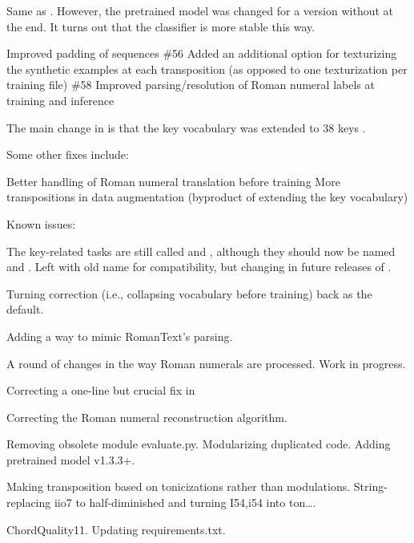 Same as . However, the pretrained model was
changed for a version without  at the end. It
turns out that the  classifier is more
stable this way.

Improved padding of sequences \#56 Added an additional
option for texturizing the synthetic examples at each
transposition (as opposed to one texturization per training
file) \#58 Improved parsing/resolution of Roman numeral
labels at training and inference

The main change in  is that the key vocabulary
was extended to 38 keys .

Some other fixes include:

Better handling of Roman numeral translation before training
More transpositions in data augmentation (byproduct of
extending the key vocabulary)

Known issues:

The key-related tasks are still called  and
 , although they should now be named
  and . Left with old
 name for compatibility, but changing in future releases of
 .

Turning correction (i.e., collapsing vocabulary before
training) back as the default.

Adding a way to mimic RomanText's parsing.

A round of changes in the way Roman numerals are processed.
Work in progress.

Correcting a one-line but crucial fix in 

Correcting the Roman numeral reconstruction algorithm.

Removing obsolete module evaluate.py. Modularizing
duplicated code. Adding pretrained model v1.3.3+.

Making transposition based on tonicizations rather than
modulations. String-replacing iio7 to half-diminished and
turning I54,i54 into ton….

ChordQuality11. Updating requirements.txt.

